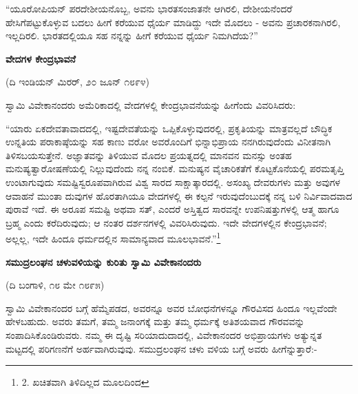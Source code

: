 “ಯೂರೋಪಿಯನ್ ಪರದೇಶೀಯನೊಬ್ಬ, ಅವನು ಭಾರತಸಂಜಾತನೇ ಆಗಿರಲಿ, ದೇಶೀಯನೆಂದರೆ ಹೇಸಿಗೆಪಟ್ಟುಕೊಳ್ಳುವ ಬದಲು ಹೀಗೆ ಕರೆಯುವ ಧೈರ್ಯ ಮಾಡಿದ್ದು ಇದೇ ಮೊದಲು - ಅವನು ಪ್ರಚಾರಕನಾಗಿರಲಿ, ಇಲ್ಲದಿರಲಿ. ಭಾರತದಲ್ಲಿಯೂ ಸಹ ನನ್ನನ್ನು ಹೀಗೆ ಕರೆಯುವ ಧೈರ್ಯ ನಿಮಗಿದೆಯ?”

\begin{center}
\textbf{ವೇದಗಳ ಕೇಂದ್ರಭಾವನೆ}
\end{center}

\begin{center}
(ದಿ ಇಂಡಿಯನ್ ಮಿರರ್, ೨೦ ಜೂನ್ ೧೮೯೪)
\end{center}

ಸ್ವಾಮಿ ವಿವೇಕಾನಂದರು ಅಮೆರಿಕಾದಲ್ಲಿ ವೇದಗಳಲ್ಲಿ ಕೇಂದ್ರಭಾವನೆಯನ್ನು ಹೀಗೆಂದು ವಿವರಿಸಿದರು:

“ಯಾರು ಏಕದೇವತಾವಾದದಲ್ಲಿ, ಇಷ್ಟದೇವತೆಯನ್ನು ಒಪ್ಪಿಕೊಳ್ಳುವುದರಲ್ಲಿ, ಪ್ರಕೃತಿಯನ್ನು ಮಾತ್ರವಲ್ಲದೆ ಬೌದ್ಧಿಕ ಉನ್ನತಿಯ ಪರಾಕಾಷ್ಠೆಯನ್ನು ಸಹ ಕಾಣು ವರೋ ಅವರೊಂದಿಗೆ ಭಿನ್ನಾಭಿಪ್ರಾಯ ನನಗಿರುವುದೆಂದು ವಿನೀತನಾಗಿ ತಿಳಿಸಬಯಸುತ್ತೇನೆ. ಅಜ್ಞಾತವನ್ನು ತಿಳಿಯುವ ಮೊದಲ ಪ್ರಯತ್ನದಲ್ಲಿ ಮಾನವನ ಮನಸ್ಸು ಅಂತಹ ಮನುಷ್ಯತ್ವಾರೋಷಣೆಯಲ್ಲಿ ನಿಲ್ಲುವುದೆಂದು ನನ್ನ ನಂಬಿಕೆ. ಮನುಷ್ಯನ ವೈಚಾರಿಕತೆಗೆ ಕೊಟ್ಟಕೊನೆಯಲ್ಲಿ ಪರಮತೃಪ್ತಿ ಉಂಟಾಗುವುದು ಸಮಷ್ಟಿಸ್ವರೂಪವಾಗಿರುವ ವಿಶ್ವ ಸಾರದ ಸಾಕ್ಷಾತ್ಕಾರದಲ್ಲಿ. ಅಸಂಖ್ಯ ದೇವರುಗಳು ಮತ್ತು ಅವುಗಳ ಆವಾಹನೆ ಮುಂತಾ ದುವುಗಳ ಹೊರತಾಗಿಯೂ ವೇದಗಳಲ್ಲಿ ಈ ಕಲ್ಪನೆ ಇರುವುದೆಂಬುದಕ್ಕೆ ನನ್ನ ಬಳಿ ನಿರ್ವಿವಾದವಾದ ಪುರಾವೆ ಇದೆ. ಈ ಅರೂಪ ಸಮಷ್ಟಿ ಅಥವಾ ಸತ್, ಎಂದರೆ ಅಸ್ತಿತ್ವದ ಸಾರವನ್ನೇ ಉಪನಿಷತ್ತುಗಳಲ್ಲಿ ಆತ್ಮ ಹಾಗೂ ಬ್ರಹ್ಮ ಎಂದು ಕರೆದಿರುವುದು; ಆ ನಂತರ ದರ್ಶನಗಳಲ್ಲಿ ವಿವರಿಸಿರುವುದು. ಇದೇ ವೇದಗಳಲ್ಲಿನ ಕೇಂದ್ರಭಾವನೆ; ಅಲ್ಲಲ್ಲ, ಇದೇ ಹಿಂದೂ ಧರ್ಮದಲ್ಲಿನ ಸಾಮಾನ್ಯವಾದ ಮೂಲಭಾವನೆ.”\footnote{2. ಖಚಿತವಾಗಿ ತಿಳಿದಿಲ್ಲದ ಮೂಲದಿಂದ}

\begin{center}
\textbf{ಸಮುದ್ರಲಂಘನ ಚಳುವಳಿಯನ್ನು ಕುರಿತು ಸ್ವಾಮಿ ವಿವೇಕಾನಂದರು}
\end{center}

\begin{center}
(ದಿ ಬಂಗಾಳಿ, ೧೮ ಮೇ ೧೮೯೫)
\end{center}

ಸ್ವಾಮಿ ವಿವೇಕಾನಂದರ ಬಗ್ಗೆ ಹೆಮ್ಮೆಪಡದ, ಅವರನ್ನೂ ಅವರ ಬೋಧನೆಗಳನ್ನೂ ಗೌರವಿಸದ ಹಿಂದೂ ಇಲ್ಲವೆಂದೇ ಹೇಳಬಹುದು. ಅವರು ತಮಗೆ, ತಮ್ಮ ಜನಾಂಗಕ್ಕೆ ಮತ್ತು ತಮ್ಮ ಧರ್ಮಕ್ಕೆ ಅತಿಶಯವಾದ ಗೌರವವನ್ನು ಸಂಪಾದಿಸಿಕೊಂಡಿರುವರು. ನಮ್ಮ ಈ ದೃಷ್ಟಿ ಸರಿಯಾದುದಾದಲ್ಲಿ, ವಿವೇಕಾನಂದರ ಅಭಿಪ್ರಾಯಗಳು ಅತ್ಯುನ್ನತ ಮಟ್ಟದಲ್ಲಿ ಪರಿಗಣನೆಗೆ ಅರ್ಹವಾಗಿರುವುವು. ಸಮುದ್ರಲಂಘನ ಚಳು ವಳಿಯ ಬಗ್ಗೆ ಅವರು ಹೀಗೆನ್ನುತ್ತಾರೆ:-


